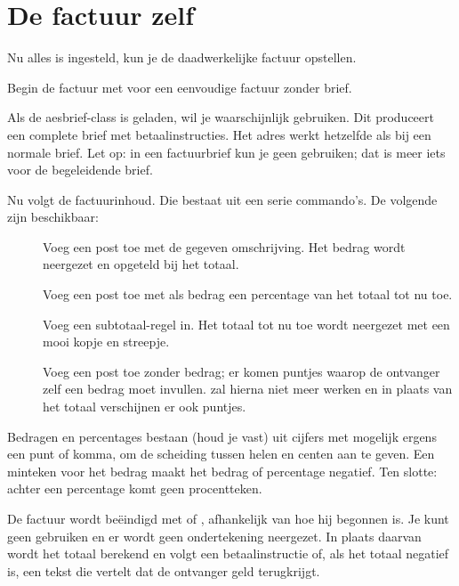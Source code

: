 \documentclass{article}
\newcommand\meta[1]{\placeholder[#1]}
\newcommand\marg[1]{\cmdarg{\meta{#1}}}
\begin{document}
\section{De factuur zelf}\label{sec:factuurzelf}

Nu alles is ingesteld, kun je de daadwerkelijke factuur opstellen.

Begin de factuur met  voor een eenvoudige factuur zonder brief.

Als de \textsf{aesbrief}-class is geladen, wil je waarschijnlijk \marg{adres}
gebruiken. Dit produceert een complete brief met betaalinstructies. Het adres werkt hetzelfde
als bij een normale brief. Let op: in een factuurbrief kun je geen  gebruiken;
dat is meer iets voor de begeleidende brief.

Nu volgt de factuurinhoud. Die bestaat uit een serie commando's. De volgende zijn beschikbaar:

\begin{description}
\item[\marg{omschrijving}\marg{bedrag}]
  Voeg een post toe met de gegeven omschrijving.
  Het bedrag wordt neergezet en opgeteld bij het totaal.
\item[\marg{omschrijving}\marg{percentage}]
  Voeg een post toe met als bedrag een percentage van het totaal tot nu toe.
\item[]
  Voeg een subtotaal-regel in. Het totaal tot nu toe wordt neergezet met een
  mooi kopje en streepje.
\item[\marg{omschrijving}]
  Voeg een post toe zonder bedrag; er komen puntjes waarop de ontvanger zelf een
  bedrag moet invullen.  zal hierna niet meer werken en in plaats
  van het totaal verschijnen er ook puntjes.
\end{description}

Bedragen en percentages bestaan (houd je vast) uit cijfers met mogelijk ergens
een punt of komma, om de scheiding tussen helen en centen aan te geven.
Een minteken voor het bedrag maakt het bedrag of percentage negatief.
Ten slotte: achter een percentage komt geen procentteken.

De factuur wordt be\"eindigd met  of , afhankelijk van
hoe hij begonnen is. Je kunt geen  gebruiken en er wordt geen ondertekening
neergezet. In plaats daarvan wordt het totaal berekend en volgt een betaalinstructie of,
als het totaal negatief is, een tekst die vertelt dat de ontvanger geld terugkrijgt.
\end{document}

